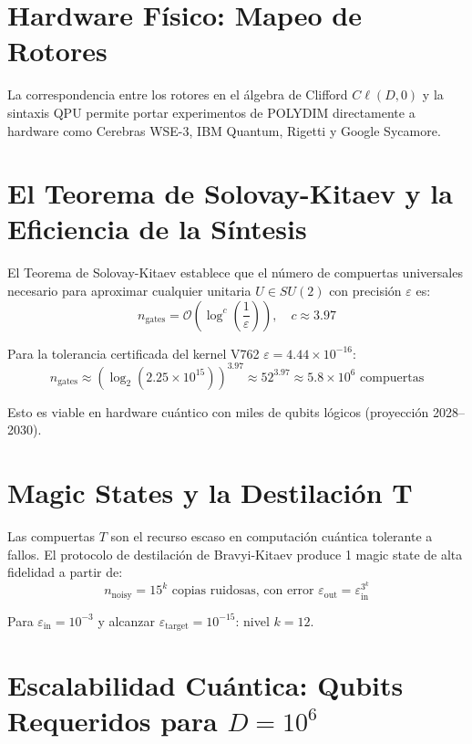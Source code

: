 \section{Hardware Físico: Mapeo de Rotores}
La correspondencia entre los rotores en el álgebra de Clifford $C\ell(D, 0)$ y la sintaxis QPU permite portar experimentos de POLYDIM directamente a hardware como Cerebras WSE-3, IBM Quantum, Rigetti y Google Sycamore.

\section{El Teorema de Solovay-Kitaev y la Eficiencia de la Síntesis}

El Teorema de Solovay-Kitaev establece que el número de compuertas universales
necesario para aproximar cualquier unitaria $U \in SU(2)$ con precisión $\varepsilon$ es:
\begin{equation}
n_{\text{gates}} = \mathcal{O}\!\left(\log^c\!\!\left(\frac{1}{\varepsilon}\right)\right), \quad c \approx 3.97
\end{equation}

Para la tolerancia certificada del kernel V762 $\varepsilon = 4.44 \times 10^{-16}$:
\begin{equation}
n_{\text{gates}} \approx \left(\log_2(2.25 \times 10^{15})\right)^{3.97} \approx 52^{3.97} \approx 5.8 \times 10^6 \text{ compuertas}
\end{equation}

Esto es viable en hardware cuántico con miles de qubits lógicos (proyección 2028--2030).

\section{Magic States y la Destilación T}

Las compuertas $T$ son el recurso escaso en computación cuántica tolerante a fallos.
El protocolo de destilación de Bravyi-Kitaev produce 1 magic state de alta fidelidad a partir de:
\begin{equation}
n_{\text{noisy}} = 15^k \text{ copias ruidosas, con error } \varepsilon_{\text{out}} = \varepsilon_{\text{in}}^{3^k}
\end{equation}

Para $\varepsilon_{\text{in}} = 10^{-3}$ y alcanzar $\varepsilon_{\text{target}} = 10^{-15}$: nivel $k = 12$.

\section{Escalabilidad Cuántica: Qubits Requeridos para $D = 10^6$}

